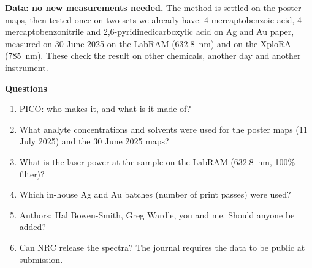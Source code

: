 \documentclass[10pt]{article}
\begin{document}
\textbf{Data: no new measurements needed.} The method is settled on the poster maps, then tested once on two sets we already have: 4-mercaptobenzoic acid, 4-mercaptobenzonitrile and 2,6-pyridinedicarboxylic acid on Ag and Au paper, measured on 30 June 2025 on the LabRAM (632.8~nm) and on the XploRA (785~nm). These check the result on other chemicals, another day and another instrument.

\textbf{Questions}
\begin{enumerate}
\item PICO: who makes it, and what is it made of?
\item What analyte concentrations and solvents were used for the poster maps (11 July 2025) and the 30 June 2025 maps?
\item What is the laser power at the sample on the LabRAM (632.8~nm, 100\% filter)?
\item Which in-house Ag and Au batches (number of print passes) were used?
\item Authors: Hal Bowen-Smith, Greg Wardle, you and me. Should anyone be added?
\item Can NRC release the spectra? The journal requires the data to be public at submission.
\end{enumerate}
\end{document}
